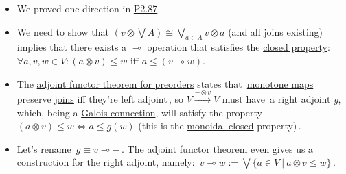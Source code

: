 \begin{itemize}
    \item  We proved one direction in \hyperref[P2.87]{P2.87}
    \item We need to show that $(v \otimes \bigvee A)\cong  \bigvee_{a \in A} v \otimes a$ (and all joins existing) implies that there exists a $\multimap$ operation that satisfies the \hyperref[D2.79]{closed property}: $\forall a,v,w \in V: (a \otimes v) \leq w$ iff $a \leq (v \multimap w)$.
    \item The \hyperref[P1.115]{adjoint functor theorem for preorders} states that \,\hyperref[D1.59]{monotone maps} preserve \hyperref[D1.81]{joins} iff they're left adjoint\,, so $V \xrightarrow{-\otimes v} V$ must have \,a right adjoint \emph{g}, which, being a \hyperref[D1.95]{Galois connection}, will satisfy the property $(a \otimes v) \leq w \iff a \leq g(w)$ (this is the \hyperref[D2.79]{monoidal closed} property)\,.
    \item Let's rename \,$g \equiv v \multimap -$\,. The adjoint functor theorem even gives us a construction for the right adjoint, namely: \,$v \multimap w:=\bigvee\{a \in V\ |\ a \otimes v \leq w\}$\,.
  \end{itemize}
